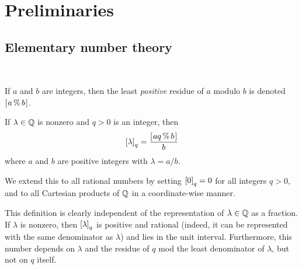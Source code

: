 \documentclass[11pt]{amsart}
\begin{document}
% 


\section{Preliminaries}



\subsection{Elementary number theory}   

\ 


If $a$ and $b$ are integers, then the least \emph{positive} residue of $a$ modulo $b$ is denoted $[ \hspace{.01in} a \, \% \, b \hspace{.01in} ]$. 

\begin{definition}  If $\lambda \in \mathbb{Q}$ is nonzero and $q>0$ is an integer, then \[ \left[ \lambda \right]_q = \frac{ [ \hspace{.01in} aq \, \% \, b \hspace{.01in} ]}{b} \] 
where $a$ and $b$ are positive integers with $\lambda = a/b$.

We extend this to all rational numbers by setting $\left[ 0 \right]_q = 0$ for all integers $q>0$, and to all Cartesian products of $\mathbb{Q}$ in a coordinate-wise manner.
\end{definition}

This definition is clearly independent of the representation of $\lambda \in \mathbb{Q}$ as a fraction.  If $\lambda$ is nonzero, then $\left[ \lambda \right]_q$ is positive and rational (indeed, it can be represented with the same denominator as $\lambda$) and lies in the unit interval.  Furthermore, this number depends on $\lambda$ and the residue of $q$ mod the least denominator of $\lambda$, but not on $q$ itself.
\end{document}
